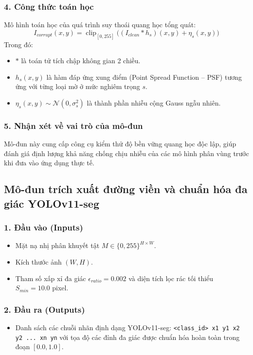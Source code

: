 \subsubsection*{4. Công thức toán học}
Mô hình toán học của quá trình suy thoái quang học tổng quát:
\begin{equation}
    I_{corrupt}(x, y) = \operatorname{clip}_{[0, 255]}\Big( (I_{clean} * h_s)(x, y) + \eta_s(x, y) \Big)
\end{equation}
Trong đó:
\begin{itemize}
    \item $*$ là toán tử tích chập không gian 2 chiều.
    \item $h_s(x, y)$ là hàm đáp ứng xung điểm (Point Spread Function -- PSF) tương ứng với từng loại mờ ở mức nghiêm trọng $s$.
    \item $\eta_s(x, y) \sim \mathcal{N}(0, \sigma_s^2)$ là thành phần nhiễu cộng Gauss ngẫu nhiên.
\end{itemize}

\subsubsection*{5. Nhận xét về vai trò của mô-đun}
Mô-đun này cung cấp công cụ kiểm thử độ bền vững quang học độc lập, giúp đánh giá định lượng khả năng chống chịu nhiễu của các mô hình phân vùng trước khi đưa vào ứng dụng thực tế.

\subsection{Mô-đun trích xuất đường viền và chuẩn hóa đa giác YOLOv11-seg}

\subsubsection*{1. Đầu vào (Inputs)}
\begin{itemize}
    \item Mặt nạ nhị phân khuyết tật $M \in \{0, 255\}^{H \times W}$.
    \item Kích thước ảnh $(W, H)$.
    \item Tham số xấp xỉ đa giác $\epsilon_{ratio} = 0.002$ và diện tích lọc rác tối thiểu $S_{min} = 10.0$ pixel.
\end{itemize}

\subsubsection*{2. Đầu ra (Outputs)}
\begin{itemize}
    \item Danh sách các chuỗi nhãn định dạng YOLOv11-seg: \texttt{<class\_id> x1 y1 x2 y2 ... xn yn} với tọa độ các đỉnh đa giác được chuẩn hóa hoàn toàn trong đoạn $[0.0, 1.0]$.
\end{itemize}


